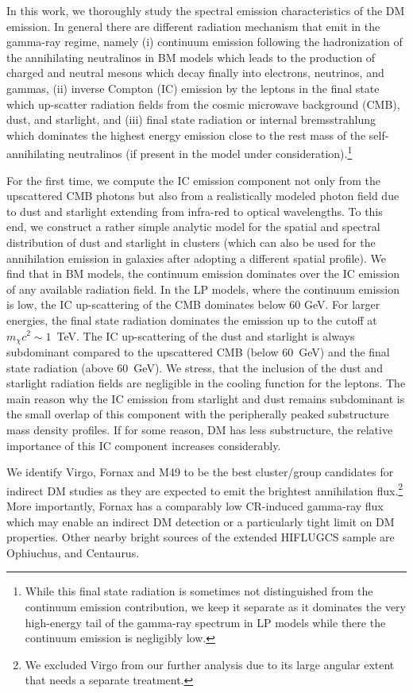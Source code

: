 \documentclass[10pt,aps,pra,reprint,amsmath,amsfonts,amssymb,showpacs,nofootinbib,floatfix]{revtex4-1}
\begin{document}
In this work, we thoroughly study the spectral emission characteristics of the
DM emission. In general there are different radiation mechanism that emit in the
gamma-ray regime, namely (i) continuum emission following the hadronization of
the annihilating neutralinos in BM models which leads to the production of
charged and neutral mesons which decay finally into electrons, neutrinos, and
gammas, (ii) inverse Compton (IC) emission by the leptons in the final state
which up-scatter radiation fields from the cosmic microwave background (CMB),
dust, and starlight, and (iii) final state radiation or internal bremsstrahlung
which dominates the highest energy emission close to the rest mass of the
self-annihilating neutralinos (if present in the model under
consideration).\footnote{While this final state radiation is sometimes not
  distinguished from the continuum emission contribution, we keep it separate as
  it dominates the very high-energy tail of the gamma-ray spectrum in LP models
  while there the continuum emission is negligibly low.}

For the first time, we compute the IC emission component not only from the
upscattered CMB photons but also from a realistically modeled photon field due
to dust and starlight extending from infra-red to optical wavelengths. To this
end, we construct a rather simple analytic model for the spatial and spectral
distribution of dust and starlight in clusters (which can also be used for the
annihilation emission in galaxies after adopting a different spatial
profile). We find that in BM models, the continuum emission dominates over the
IC emission of any available radiation field. In the LP models, where the
continuum emission is low, the IC up-scattering of the CMB dominates below 60
GeV. For larger energies, the final state radiation dominates the emission up to
the cutoff at $m_\chi c^2 \sim 1$~TeV. The IC up-scattering of the dust and
starlight is always subdominant compared to the upscattered CMB (below 60~GeV)
and the final state radiation (above 60~GeV). We stress, that the inclusion of
the dust and starlight radiation fields are negligible in the cooling function
for the leptons. The main reason why the IC emission from starlight and dust
remains subdominant is the small overlap of this component with the peripherally
peaked substructure mass density profiles. If for some reason, DM has less
substructure, the relative importance of this IC component increases
considerably.

We identify Virgo, Fornax and M49 to be the best cluster/group candidates for
indirect DM studies as they are expected to emit the brightest annihilation
flux.\footnote{We excluded Virgo from our further analysis due to its large
  angular extent that needs a separate treatment.} More importantly, Fornax has
a comparably low CR-induced gamma-ray flux which may enable an indirect DM
detection or a particularly tight limit on DM properties. Other nearby bright
sources of the extended HIFLUGCS sample are Ophiuchus, and Centaurus.
\end{document}

